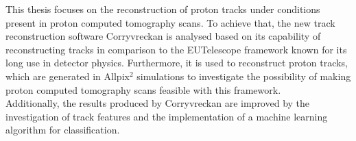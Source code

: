 This thesis focuses on the reconstruction of proton tracks under conditions present in proton computed tomography scans. To achieve that, the new track reconstruction software
Corryvreckan \cite{corryvreckan} is analysed based on its capability of reconstructing tracks in comparison to the EUTelescope framework \cite{gbl} known
for its long use in detector physics. Furthermore,
it is used to reconstruct
proton tracks, which are generated in Allpix$^2$ \cite{allpix} simulations to investigate the possibility of making proton computed tomography scans feasible with this framework. \\
Additionally, the results produced by Corryvreckan are improved by the investigation of track features and the implementation of a machine learning algorithm for classification.



%
